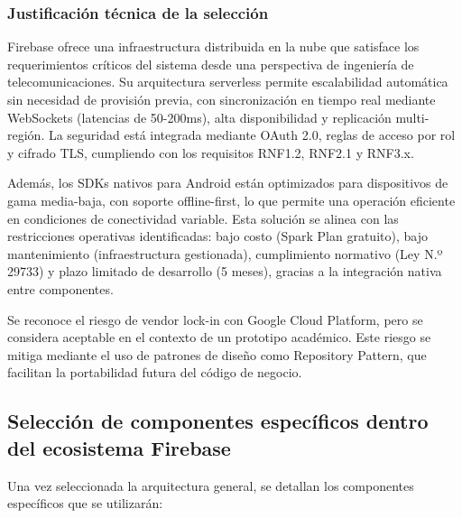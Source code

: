 \subsubsection{Justificación técnica de la selección}

Firebase ofrece una infraestructura distribuida en la nube que satisface los requerimientos críticos del sistema desde una perspectiva de ingeniería de telecomunicaciones. Su arquitectura serverless permite escalabilidad automática sin necesidad de provisión previa, con sincronización en tiempo real mediante WebSockets (latencias de 50-200ms), alta disponibilidad y replicación multi-región. La seguridad está integrada mediante OAuth 2.0, reglas de acceso por rol y cifrado TLS, cumpliendo con los requisitos RNF1.2, RNF2.1 y RNF3.x.

Además, los SDKs nativos para Android están optimizados para dispositivos de gama media-baja, con soporte offline-first, lo que permite una operación eficiente en condiciones de conectividad variable. Esta solución se alinea con las restricciones operativas identificadas: bajo costo (Spark Plan gratuito), bajo mantenimiento (infraestructura gestionada), cumplimiento normativo (Ley N.º 29733) y plazo limitado de desarrollo (5 meses), gracias a la integración nativa entre componentes.

Se reconoce el riesgo de vendor lock-in con Google Cloud Platform, pero se considera aceptable en el contexto de un prototipo académico. Este riesgo se mitiga mediante el uso de patrones de diseño como Repository Pattern, que facilitan la portabilidad futura del código de negocio.

\subsection{Selección de componentes específicos dentro del ecosistema Firebase}

Una vez seleccionada la arquitectura general, se detallan los componentes específicos que se utilizarán:

